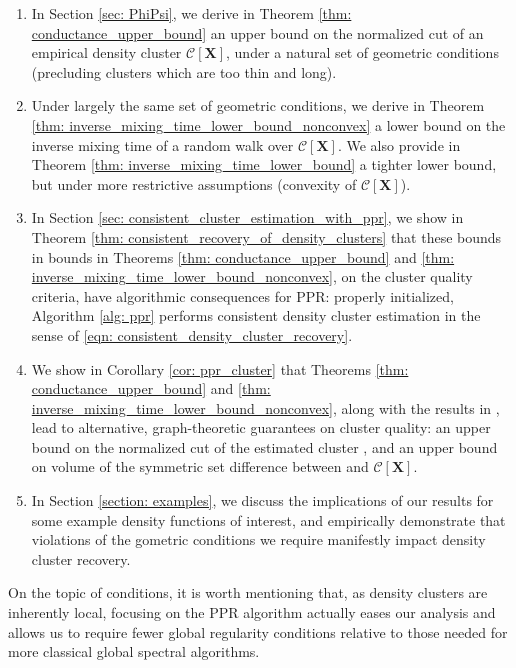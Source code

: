 \documentclass{article}
\newcommand{\1}{\mathbf{1}}
\newcommand{\Xbf}{\mathbf{X}}
\newcommand{\Cset}{\mathcal{C}}
\theoremstyle{aldenthm}
\theoremstyle{aldenrmrk}
\begin{document}
\begin{enumerate}
\item In Section \ref{sec: PhiPsi}, we derive in Theorem \ref{thm:
    conductance_upper_bound} an upper bound on the normalized cut of an
  empirical density cluster $\Cset[\Xbf]$, under a natural set of    
  geometric conditions (precluding clusters which are too thin and long).

\item Under largely the same set of geometric conditions, we derive in Theorem
  \ref{thm: inverse_mixing_time_lower_bound_nonconvex} a lower bound on the
  inverse mixing time of a random walk over $\Cset[\Xbf]$.  We also provide in
  Theorem \ref{thm: inverse_mixing_time_lower_bound} a tighter lower bound, but
  under more restrictive assumptions (convexity of $\Cset[\Xbf]$).
	
\item In Section \ref{sec: consistent_cluster_estimation_with_ppr}, we show in
  Theorem \ref{thm: consistent_recovery_of_density_clusters} that these bounds
  in bounds in Theorems \ref{thm: conductance_upper_bound} and \ref{thm:
    inverse_mixing_time_lower_bound_nonconvex},
  on the cluster quality criteria, have algorithmic consequences for PPR:
  properly initialized, Algorithm \ref{alg: ppr} performs consistent density
  cluster estimation in the sense of \eqref{eqn:
    consistent_density_cluster_recovery}. 
	
\item We show in Corollary \ref{cor: ppr_cluster} that Theorems \ref{thm:
    conductance_upper_bound} and \ref{thm:
    inverse_mixing_time_lower_bound_nonconvex}, along with the results in 
  \citet{zhu2013}, lead to alternative, graph-theoretic guarantees on cluster 
  quality: an upper bound on the normalized cut of the estimated cluster 
  , and an upper bound on volume of the symmetric set
  difference between  and $\Cset[\Xbf]$.    

\item In Section \ref{section: examples}, we discuss the implications of our
  results for some example density functions of interest, and empirically
  demonstrate that violations of the gometric conditions we require manifestly
  impact density cluster recovery. 
\end{enumerate}

On the topic of conditions, it is worth mentioning that, as density clusters
are inherently local, focusing on the PPR algorithm actually eases our analysis
and allows us to require fewer global regularity conditions relative to those
needed for more classical global spectral algorithms.    
\end{document}
